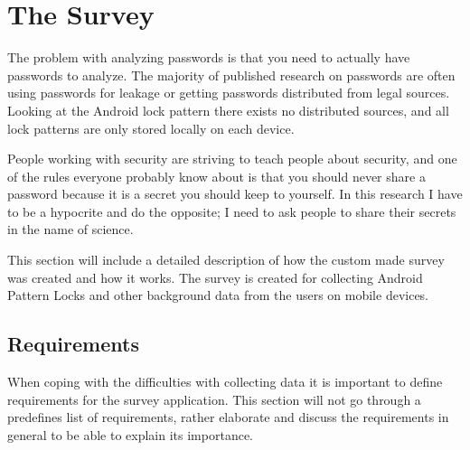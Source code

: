 \section{The Survey}\label{sec:survey}
  
  The problem with analyzing passwords is that you need to actually have passwords to analyze. The majority of published research on passwords are often using passwords for leakage or getting passwords distributed from legal sources. Looking at the Android lock pattern there exists no distributed sources, and all lock patterns are only stored locally on each device. 

  People working with security are striving to teach people about security, and one of the rules everyone probably know about is that you should never share a password because it is a secret you should keep to yourself. In this research I have to be a hypocrite and do the opposite; I need to ask people to share their secrets in the name of science. 

  This section will include a detailed description of how the custom made survey was created and how it works. The survey is created for collecting Android Pattern Locks and other background data from the users on mobile devices. 

  \subsection{Requirements}

    When coping with the difficulties with collecting data it is important to define requirements for the survey application. This section will not go through a predefines list of requirements, rather elaborate and discuss the requirements in general to be able to explain its importance.

